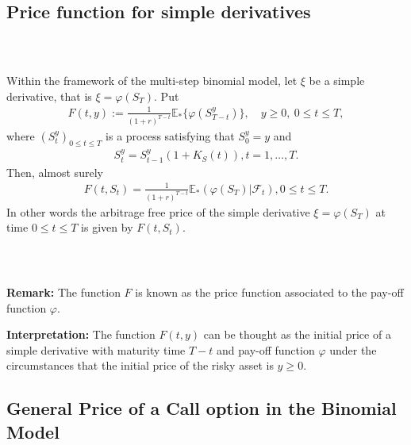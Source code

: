 \documentclass{beamer}
\numberwithin{equation}{section}
\begin{document}
\subsection{Price function for simple derivatives}

\begin{frame}\frametitle{{\normalsize \secname} \\ {\large \subsecname}}
    \begingroup
    \small
    \begin{theorem}\label{th:price_function}
        Within the framework of the multi-step binomial model, let $\xi$ be a simple derivative, that is $\xi = \varphi(S_T)$.
        Put
        \begin{align}
            F(t,y) := \frac{1}{(1+r)^{T-t}} \mathbb{E}_* \{ \varphi (S_{T-t}^y) \}, \quad y \geq 0, \ 0 \leq t \leq T,
        \end{align}
        where $(S_t^y)_{0 \leq t \leq T}$ is a process satisfying that $S_0^y = y$ and
        \begin{align}
            S_t^y = S_{t-1}^y(1 + K_S(t)), t = 1, \ldots, T.
        \end{align}
        Then, almost surely
        \begin{align}
            F(t, S_t) = \frac{1}{(1+r)^{T-t}} \mathbb{E}_* (\varphi(S_T) | \mathscr{F}_t), 0 \leq t \leq T.
        \end{align}
        In other words the arbitrage free price of the simple derivative $\xi = \varphi(S_T)$ at time $0 \leq t \leq T$ is given by $F(t, S_t)$.
    \end{theorem}
    \endgroup
\end{frame}

\begin{frame}\frametitle{{\normalsize \secname} \\ {\large \subsecname}}
    \textbf{Remark:} The function $F$ is known as the price function associated to the pay-off function $\varphi$.
    \vspace{1cm}

    \textbf{Interpretation:} The function $F(t,y)$ can be thought as the initial price of a simple derivative with maturity time $T-t$ and pay-off function $\varphi$ under the circumstances that the initial price of the risky asset is $y \geq 0$.
\end{frame}

\subsection{General Price of a Call option in the Binomial Model}
\end{document}
